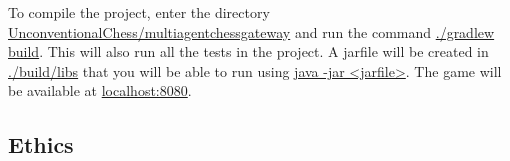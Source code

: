 \documentclass{article}
\begin{document}
To compile the project, enter the directory \url{UnconventionalChess/multiagentchessgateway} and run the command \url{./gradlew build}. This will also run all the tests in the project. A jarfile will be created in \url{./build/libs} that you will be able to run using \url{java -jar <jarfile>}. The game will be available at \url{localhost:8080}.

\subsection{Ethics}


\vspace{12pt}
\end{document}
